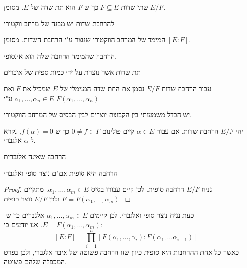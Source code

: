 \documentclass{tstextbook}
\begin{document}
\begin{definition}
שתי שדות \(F\subseteq E\) כך ש-\(F\) הוא תת שדה של \(E\). מסומן \(E / F\).

\end{definition}
\begin{proposition}
להרחבת שדות יש מבנה של מרחב ווקטורי.

\end{proposition}
\begin{definition}
המימד של המרחב הווקטורי שנוצר ע"י הרחבת השדות. מסומן \([E:F]\).

\end{definition}
\begin{definition}
הרחבה שהמימד הרחבה שלה הוא אינסופי.

\end{definition}
\begin{definition}
תת שדות אשר נוצרת על ידי כמות ספית של איברים

\end{definition}
\begin{definition}
עבור הרחבת שדות \(E / F\) נסמן את התת שדה המנימלי של \(E\) שמכיל את \(F\) ואת \(\alpha_{1},\dots,\alpha_{n}\in E\) ע"י \(F\left( \alpha_{1},\dots,\alpha_{n} \right)\)

\end{definition}
\begin{remark}
יש הבדל משמעותי בין הקבוצת יוצרים לבין הבסיס של המרחב הווקטורי.

\end{remark}
\begin{definition}
יהי \(E / F\) הרחבת שדות. אם עבור \(\alpha \in E\) קיים פולינום \(0 \neq f \in F\) כך ש-\(f\left( \alpha \right)=0\), נקרא ל-\(\alpha\) אלגברי.

\end{definition}
\begin{definition}
הרחבה שאינה אלגברית

\end{definition}
\begin{proposition}
הרחבה היא סופית אם"ם נוצר סופי ואלגברי

\end{proposition}
\begin{proof}
נניח \(E / F\) הרחבה סופית. לכן קיים עבורו בסיס \(\alpha_{1},\dots,\alpha_{m} \in E\). מתקיים \(E=F\left( \alpha_{1},\dots,\alpha_{m} \right)\) ולכן \(E / F\) נוצר סופית.

\end{proof}
כעת נניח נוצר סופי ואלגברי. לכן קיימים \(\alpha_{1},\dots,\alpha_{m} \in E\) אלגברים כך ש-\(E=F\left( \alpha_{1},\dots,\alpha_{m} \right)\). אנו יודעים כי:
$$[E:F]=\prod_{i=1}^{n}\left[ F\left( \alpha_{1},\dots,\alpha_{i} \right):F\left( \alpha_{1},\dots \alpha_{i-1} \right) \right]$$
כאשר כל אחת ההרחבות היא סופית כיוון שזו הרחבה פשוטה של איבר אלגברי, ולכן בפרט המכפלה שלהם פשוטה.
\end{document}
